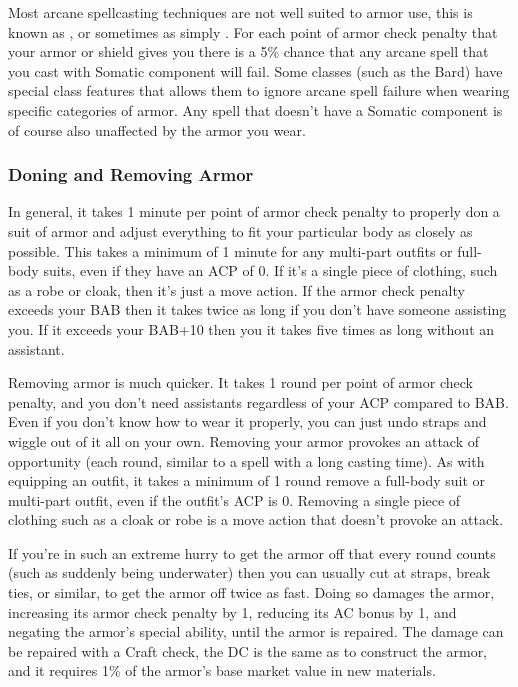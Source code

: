 Most arcane spellcasting techniques are not well suited to armor use, this is known as , or sometimes as simply . For each point of armor check penalty that your armor or shield gives you there is a 5\% chance that any arcane spell that you cast with Somatic component will fail. Some classes (such as the Bard) have special class features that allows them to ignore arcane spell failure when wearing specific categories of armor. Any spell that doesn't have a Somatic component is of course also unaffected by the armor you wear.

\subsubsection{Doning and Removing Armor}

In general, it takes 1 minute per point of armor check penalty to properly don a suit of armor and adjust everything to fit your particular body as closely as possible. This takes a minimum of 1 minute for any multi-part outfits or full-body suits, even if they have an ACP of 0. If it's a single piece of clothing, such as a robe or cloak, then it's just a move action. If the armor check penalty exceeds your BAB then it takes twice as long if you don't have someone assisting you. If it exceeds your BAB+10 then you it takes five times as long without an assistant.

Removing armor is much quicker. It takes 1 round per point of armor check penalty, and you don't need assistants regardless of your ACP compared to BAB. Even if you don't know how to wear it properly, you can just undo straps and wiggle out of it all on your own. Removing your armor provokes an attack of opportunity (each round, similar to a spell with a long casting time). As with equipping an outfit, it takes a minimum of 1 round remove a full-body suit or multi-part outfit, even if the outfit's ACP is 0. Removing a single piece of clothing such as a cloak or robe is a move action that doesn't provoke an attack.

If you're in such an extreme hurry to get the armor off that every round counts (such as suddenly being underwater) then you can usually cut at straps, break ties, or similar, to get the armor off twice as fast. Doing so damages the armor, increasing its armor check penalty by 1, reducing its AC bonus by 1, and negating the armor's special ability, until the armor is repaired. The damage can be repaired with a Craft check, the DC is the same as to construct the armor, and it requires 1\% of the armor's base market value in new materials.

